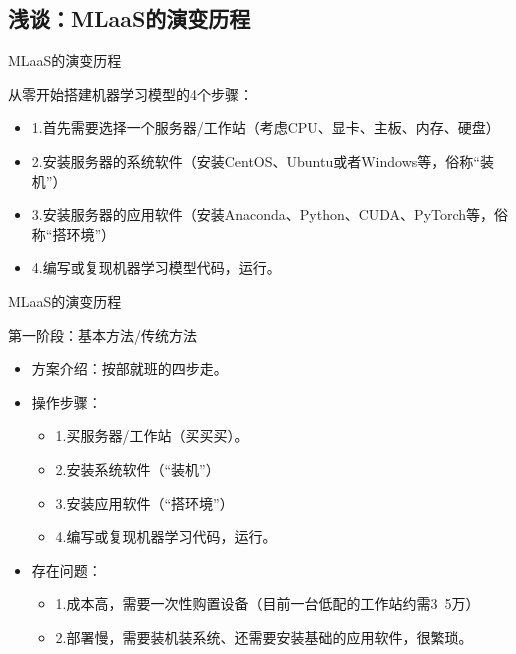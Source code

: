 \documentclass{beamer}
\begin{document}
\subsection{浅谈：MLaaS的演变历程}
\begin{frame}{MLaaS的演变历程}
	\begin{exampleblock}{从零开始搭建机器学习模型的4个步骤：}
    \begin{itemize}[<+-| alert@+>]
        \item 1.首先需要选择一个服务器/工作站（考虑CPU、显卡、主板、内存、硬盘）
        \item 2.安装服务器的系统软件（安装CentOS、Ubuntu或者Windows等，俗称“装机”）
        \item 3.安装服务器的应用软件（安装Anaconda、Python、CUDA、PyTorch等，俗称“搭环境”）
        \item 4.编写或复现机器学习模型代码，运行。
    \end{itemize}
    \end{exampleblock}
\end{frame}

\begin{frame}{MLaaS的演变历程}
	\begin{exampleblock}{第一阶段：基本方法/传统方法}
    \begin{itemize} %
    	\item 方案介绍：按部就班的四步走。
    	\item 操作步骤：
    		\begin{itemize}
				\item 1.买服务器/工作站（买买买）。
				\item 2.安装系统软件（“装机”）
				\item 3.安装应用软件（“搭环境”）
				\item 4.编写或复现机器学习代码，运行。
			\end{itemize}
    	\item 存在问题：
    	\begin{itemize}
			\item 1.成本高，需要一次性购置设备（目前一台低配的工作站约需3~5万）
			\item 2.部署慢，需要装机装系统、还需要安装基础的应用软件，很繁琐。
       	\end{itemize}
    \end{itemize}
    \end{exampleblock}
\end{frame}
\end{document}
